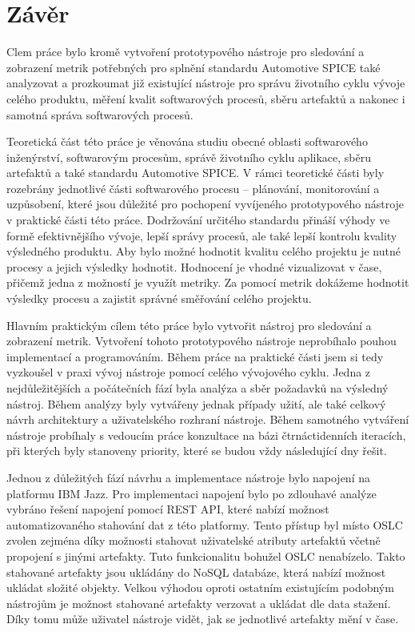 \documentclass[czech,master]{diploma}
\begin{document}
\chapter{Závěr}
Clem práce bylo kromě vytvoření prototypového nástroje pro sledování a zobrazení metrik potřebných pro splnění standardu Automotive SPICE také analyzovat a prozkoumat již existující nástroje pro správu životního cyklu vývoje celého produktu, měření kvalit softwarových procesů, sběru artefaktů a nakonec i samotná správa softwarových procesů.

Teoretická část této práce je věnována studiu obecné oblasti softwarového inženýrství, softwarovým procesům, správě životního cyklu aplikace, sběru artefaktů a také standardu Automotive SPICE. V rámci teoretické části byly rozebrány jednotlivé části softwarového procesu -- plánování, monitorování a uzpůsobení, které jsou důležité pro pochopení vyvíjeného prototypového nástroje v praktické části této práce. Dodržování určitého standardu přináší výhody ve formě efektivnějšího vývoje, lepší správy procesů, ale také lepší kontrolu kvality výsledného produktu. Aby bylo možné hodnotit kvalitu celého projektu je nutné procesy a jejich výsledky hodnotit. Hodnocení je vhodné vizualizovat v čase, přičemž jedna z možností je využít metriky. Za pomocí metrik dokážeme hodnotit výsledky procesu a zajistit správné směřování celého projektu.

Hlavním praktickým cílem této práce bylo vytvořit nástroj pro sledování a zobrazení metrik. Vytvoření tohoto prototypového nástroje neprobíhalo pouhou implementací a programováním.  Během práce na praktické části jsem si tedy vyzkoušel v praxi vývoj nástroje pomocí celého vývojového cyklu. Jedna z nejdůležitějších a počátečních fází byla analýza a sběr požadavků na výsledný nástroj. Během analýzy byly vytvářeny jednak případy užití, ale také celkový návrh architektury a uživatelského rozhraní nástroje. Během samotného vytváření nástroje probíhaly s vedoucím práce konzultace na bázi čtrnáctidenních iteracích, při kterých byly stanoveny priority, které se budou vždy následující dny řešit.

Jednou z důležitých fází návrhu a implementace nástroje bylo napojení na platformu IBM Jazz. Pro implementaci napojení bylo po zdlouhavé analýze vybráno řešení napojení pomocí REST API, které nabízí možnost automatizovaného stahování dat z této platformy. Tento přístup byl místo OSLC zvolen zejména díky možnosti stahovat uživatelské atributy artefaktů včetně propojení s jinými artefakty. Tuto funkcionalitu bohužel OSLC nenabízelo. Takto stahované artefakty jsou ukládány do NoSQL databáze, která nabízí možnost ukládat složité objekty. Velkou výhodou oproti ostatním existujícím podobným nástrojům je možnost stahované artefakty verzovat a ukládat dle data stažení. Díky tomu může uživatel nástroje vidět, jak se jednotlivé artefakty mění v čase.
\end{document}
